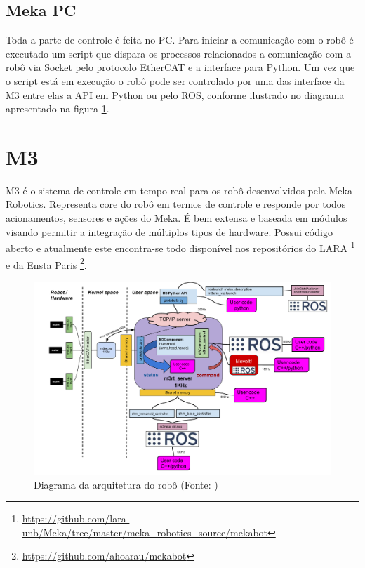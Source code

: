 
\subsection{Meka PC}

Toda a parte de controle é feita no PC. Para iniciar a comunicação com o robô é executado um script que dispara os processos relacionados a comunicação com a robô via Socket pelo protocolo EtherCAT e a interface para Python. Um vez que o script está em execução o robô pode ser controlado por uma das interface da M3 entre elas a API em Python ou pelo ROS, conforme ilustrado no diagrama apresentado na figura \ref{fig:m3arch}.

\section{M3}

M3 é o sistema de controle em tempo real para os robô desenvolvidos pela Meka Robotics. Representa core do robô em termos de controle e responde por todos acionamentos, sensores e ações do Meka. É bem extensa e baseada em módulos visando permitir a integração de múltiplos tipos de hardware. Possui código aberto e atualmente este encontra-se todo disponível nos repositórios do LARA \footnote{\url{https://github.com/lara-unb/Meka/tree/master/meka_robotics_source/mekabot}} e da Ensta Paris \footnote{\url{https://github.com/ahoarau/mekabot}}.

\begin{figure}[ht]
    \centering
    \includegraphics[width=\linewidth]{figs/m3_arch.pdf}
    \caption{Diagrama da arquitetura do robô (Fonte: \cite{hoarau_2015})}
    \label{fig:m3arch}
\end{figure}


